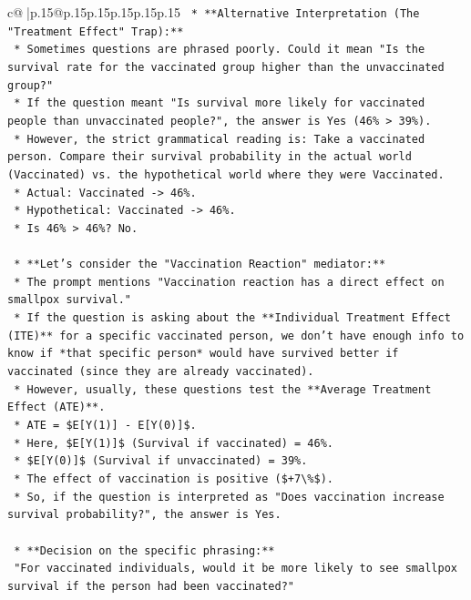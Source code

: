 \documentclass{article}
\begin{document}
{\begin{supertabular}{c@{$\;$}|p{.15\linewidth}@{}p{.15\linewidth}p{.15\linewidth}p{.15\linewidth}p{.15\linewidth}p{.15\linewidth}}
{{{\texttt{    *   **Alternative Interpretation (The "Treatment Effect" Trap):**} \\
\texttt{        *   Sometimes questions are phrased poorly. Could it mean "Is the survival rate for the vaccinated group higher than the unvaccinated group?"} \\
\texttt{        *   If the question meant "Is survival more likely for vaccinated people than unvaccinated people?", the answer is Yes (46\% > 39\%).} \\
\texttt{        *   However, the strict grammatical reading is: Take a vaccinated person. Compare their survival probability in the actual world (Vaccinated) vs. the hypothetical world where they were Vaccinated.} \\
\texttt{        *   Actual: Vaccinated {-}> 46\%.} \\
\texttt{        *   Hypothetical: Vaccinated {-}> 46\%.} \\
\texttt{        *   Is 46\% > 46\%? No.} \\
\\ 
\texttt{    *   **Let's consider the "Vaccination Reaction" mediator:**} \\
\texttt{        *   The prompt mentions "Vaccination reaction has a direct effect on smallpox survival."} \\
\texttt{        *   If the question is asking about the **Individual Treatment Effect (ITE)** for a specific vaccinated person, we don't have enough info to know if *that specific person* would have survived better if vaccinated (since they are already vaccinated).} \\
\texttt{        *   However, usually, these questions test the **Average Treatment Effect (ATE)**.} \\
\texttt{        *   ATE = \$E{[}Y(1){]} {-} E{[}Y(0){]}\$.} \\
\texttt{        *   Here, \$E{[}Y(1){]}\$ (Survival if vaccinated) = 46\%.} \\
\texttt{        *   \$E{[}Y(0){]}\$ (Survival if unvaccinated) = 39\%.} \\
\texttt{        *   The effect of vaccination is positive (\$+7\textbackslash{}\%\$).} \\
\texttt{        *   So, if the question is interpreted as "Does vaccination increase survival probability?", the answer is Yes.} \\
\\ 
\texttt{    *   **Decision on the specific phrasing:**} \\
\texttt{        "For vaccinated individuals, would it be more likely to see smallpox survival if the person had been vaccinated?"} \\
}}}
\end{supertabular}}
\end{document}
